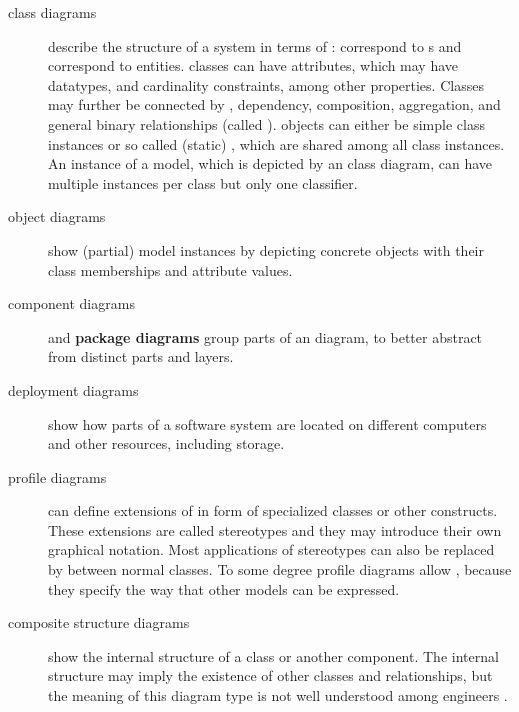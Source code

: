 \begin{description}
\item[class diagrams] describe the structure of a system in terms of
  :  correspond to
   s and  correspond to entities. 
   classes can have attributes, which may have datatypes, and 
  cardinality constraints, among other properties.
  Classes may further be connected by 
  , dependency, composition, aggregation, and general binary
  relationships (called ).
   objects can either be simple class instances or so called 
  (static) , which are shared among all 
  class instances. An instance of a model, which is depicted by an 
  class diagram, can have multiple instances per class 
  but only one classifier.

\item[object diagrams] show (partial) model instances by depicting concrete 
  objects with their class memberships and attribute values.

\item[component diagrams] and \textbf{package diagrams} group parts of an 
  diagram, to better abstract from distinct parts and layers.

\item[deployment diagrams] show how parts of a software system are located
  on different computers and other resources, including storage.

\item[profile diagrams] can define extensions of  in form of 
  specialized classes or other constructs. These extensions are called 
  stereotypes and they may introduce their own graphical notation. Most
  applications of  stereotypes can also be replaced by 
   between normal classes. To some degree profile diagrams 
  allow , because they specify the way that other models
  can be expressed.

\item[composite structure diagrams] show the internal structure of a class or
  another component. The internal structure may imply the existence of other
  classes and relationships, but the meaning of this diagram type is not
  well understood among engineers \cite{Oliver2006}.

\end{description}


